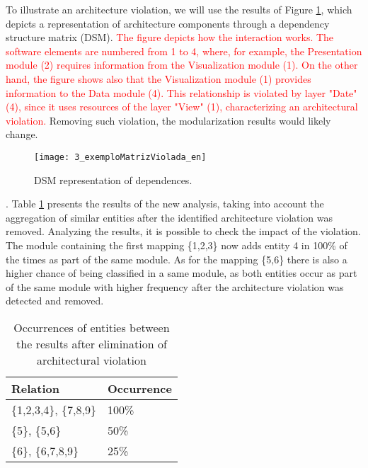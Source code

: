 To illustrate an architecture violation, we will use the results of Figure \ref{3_exemploMatrizViolada}, which depicts a representation of architecture components through a dependency structure matrix (DSM). \textcolor{red}{The figure depicts how the interaction works. The software elements are numbered from 1 to 4, where, for example, the Presentation module (2) requires information from the Visualization module (1). On the other hand, the figure shows also that the Visualization module (1) provides information to the Data module (4). This relationship is violated by layer "Date" (4), since it uses resources of the layer  "View" (1), characterizing an architectural violation.} Removing such violation, the modularization results would likely change. 

 \begin{figure}[!h]
 	\centering
 	\texttt{[image: 3\_exemploMatrizViolada\_en]}
 	\caption{DSM representation	of dependences.}
 	\label{3_exemploMatrizViolada}
 \end{figure}
 
. Table \ref{ocorrencias_2} presents the results of the new analysis, taking into account the aggregation of similar entities after the identified architecture violation was removed. Analyzing the results, it is possible to check the impact of the violation. The module containing the first mapping \{1,2,3\} now adds entity 4 in 100\% of the times as part of the same module. As for the mapping \{5,6\} there is also a higher chance of being classified in a same module, as both entities occur as part of the same module with higher frequency after the architecture violation was detected and removed.


\begin{table}[]
	\centering
	\caption{Occurrences of entities between the results after elimination of architectural violation}
	\label{ocorrencias_2}
	\begin{tabular}{|ll|}
		\hline
		\multicolumn{1}{|l}{Relation} & \multicolumn{1}{l|}{Occurrence} \\ \hline
		\{1,2,3,4\}, \{7,8,9\}  	 & 100\%                           \\ \hline
		\{5\}, \{5,6\}	& 50\%                            \\ \hline
		\{6\}, \{6,7,8,9\}	& 25\%                            \\ 
		\hline
	\end{tabular}
\end{table}

